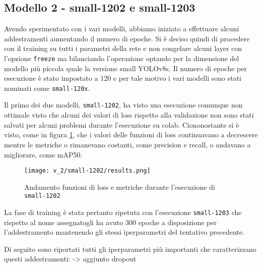 \subsection*{Modello 2 - small-1202 e small-1203}

Avendo sperimentato con i vari modelli, abbiamo iniziato a effettuare alcuni addestramenti aumentando il
numero di epoche. Si è deciso quindi di procedere con il training su tutti i parametri della rete e non
congelare alcuni layer con l'opzione \verb|freeze| ma bilanciando l'operazione optando per la dimensione
del modello più piccola quale la versione small YOLOv8s. Il numero di epoche per esecuzione è stato impostato a 120 e per tale motivo i vari modelli sono stati
nominati come \verb|small-120x|. 

Il primo dei due modelli, \verb|small-1202|, ha visto una esecuzione 
comunque non ottimale visto che alcuni dei valori di loss rispetto alla validazione non sono stati 
salvati per alcuni problemi durante l'esecuzione su colab. Ciononostante si è visto, come in figura
\ref*{fig:v2-1}, che i valori delle funzioni di loss continuavano a decrescere mentre le metriche
o rimanevano costanti, come precision e recall, o andavano a migliorare, come mAP50.

\begin{figure}[h]
    \centering
    \texttt{[image: v\_2/small-1202/results.png]}
    \caption{Andamento funzioni di loss e metriche durante l'esecuzione di \texttt{small-1202}}
    \label{fig:v2-1}
\end{figure}

La fase di training è stata pertanto ripetuta con l'esecuzione \verb|small-1203| che rispetto al nome assegnatogli
ha avuto 300 epoche a disposizione per l'addestramento mantenendo gli stessi iperparametri del tentativo precedente.

Di seguito sono riportati tutti gli iperparametri più importanti che caratterizzano questi addestramenti:
-> aggiunto dropout



